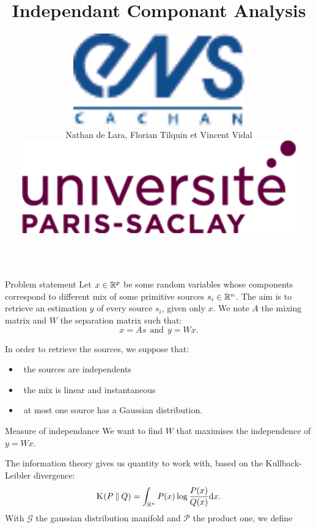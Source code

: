 \documentclass{beamer}
\title{\Huge Independant Componant Analysis}
\author[Lara, Tilquin, Vidal]
{
	\parbox{.25\textwidth}{\includegraphics[height=4cm]{ENS_cachan.pdf}}%
	\parbox{.5\textwidth}{\hfil \huge Nathan de Lara, Florian Tilquin et Vincent Vidal \hfil}%
	\parbox{.25\textwidth}{\hspace{2cm} \includegraphics[height=4cm]{UPS.png}}%
}
\institute[Université Paris-Saclay]{\LARGE Master Mathématiques, Vision et Apprentissage}
\date{}
\newcommand{\Kl}[3][]{\mathrm K_{#1}\!\zp{#2\:\|\:#3}}
\newcommand{\zD}{\mathcal}
\begin{document}
\begin{frame}{}
	\maketitle
\begin{columns}[T]
\begin{column}{.48\linewidth}


\begin{block}{Problem statement}
Let $x\in\mathbb{R}^p$ be some random variables whose components correspond to different mix of some primitive sources $s_i\in\mathbb{R}^n$. The aim is to retrieve an estimation $y$ of every source $s_i$, given only $x$. We note $A$ the mixing matrix and $W$ the separation matrix such that:
\begin{equation}
\label{eqn:pb}
 x = A s \ \ \mbox{and} \ \ y = W x.
\end{equation}

In order to retrieve the sources, we suppose that:\begin{itemize}
\item \ the sources are independents
\item \ the mix is linear and instantaneous
\item \ at most one source has a Gaussian distribution.  
\end{itemize}
\end{block}


\begin{block}{Measure of independance}
We want to find $W$ that maximises the independence of $y=Wx$.

The information theory gives us quantity to work with, based on the Kullback-Leibler divergence:
\begin{equation}
  \Kl PQ = \int_{\zR^n} P(x) \log\frac{P(x)}{Q(x)} \zdx x.
\end{equation}
With $\zD G$ the gaussian distribution manifold and $\zD P$ the product one, we define


\end{block}
\end{column}
\end{columns}
\end{frame}
\end{document}
